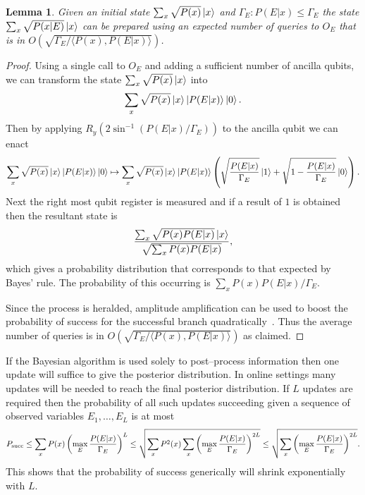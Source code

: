 \documentclass[aps,amsmath,onecolumn,amssymb]{revtex4}
\newtheorem{lemma}{Lemma}
\begin{document}
\begin{lemma}
Given an initial state $\sum_x \sqrt{P(x)} \left|x\right\rangle$ and $\Gamma_E : P(E|x) \le \Gamma_E$ the state $\sum_x \sqrt{P(x|E)} \left|x\right\rangle$ can be prepared using an expected number of queries to $O_E$ that is in $O(\sqrt{\Gamma_E/\langle P(x), P(E|x)\rangle})$.\label{lem:rejection}
\end{lemma}
\begin{proof}
Using a single call to $O_E$ and adding a sufficient number of ancilla qubits, we can transform the state $\sum_x \sqrt{P(x)} \left|x\right\rangle$ into
\begin{equation}
\sum_x \sqrt{P(x)} \left|x\right\rangle \left|P(E|x)\right\rangle\left|0\right\rangle.
\end{equation}
Then by applying $R_y(2 \sin^{-1}(P(E|x)/\Gamma_E))$ to the ancilla qubit we can enact
\begin{equation}
\sum_x \sqrt{P(x)} \left|x\right\rangle \left|P(E|x)\right\rangle\left|0\right\rangle\mapsto \sum_x \sqrt{P(x)} \left|x\right\rangle \left|P(E|x)\right\rangle\left(\sqrt{\frac{P(E|x)}{\Gamma_E}}\left|1\right\rangle + \sqrt{1-\frac{P(E|x)}{\Gamma_E}}\left|0\right\rangle \right).\label{eq:rejection}
\end{equation}
Next the right most qubit register is measured and if a result of $1$ is obtained then the resultant state is
\begin{equation}
\frac{\sum_{x} \sqrt{P(x) P(E|x)}\left|x\right\rangle}{\sqrt{\sum_x P(x)P(E|x)}},
\end{equation}
which gives a probability distribution that corresponds to that expected by Bayes' rule.  The probability of this occurring is $\sum_x P(x) P(E|x) /\Gamma_E$.

Since the process is heralded, amplitude amplification can be used to boost the probability of success for the successful branch quadratically~\cite{BHM+02}.  Thus the average number of queries is in $O(\sqrt{\Gamma_E/\langle P(x), P(E|x)\rangle})$ as claimed.
\end{proof}
If the Bayesian algorithm is used solely to post--process information then one update will suffice to give the posterior distribution.  In online settings many updates will be needed to reach the final posterior distribution.  If $L$ updates are required then the probability of all such updates succeeding given a sequence of observed variables $E_1,\ldots,E_L$ is at most
\begin{equation}
P_{\rm succ} \le \sum_x P(x) \left(\max_E \frac{P(E|x)}{\Gamma_E}\right)^L\le \sqrt{\sum_x P^2(x)\sum_x \left(\max_E \frac{P(E|x)}{\Gamma_E}\right)^{2L}}\le\sqrt{\sum_x \left(\max_E \frac{P(E|x)}{\Gamma_E}\right)^{2L}}.
\end{equation}
This shows that the probability of success generically will shrink exponentially with $L$.
\end{document}
